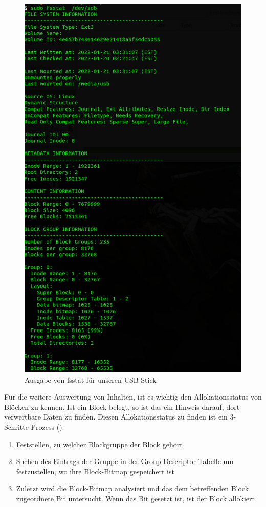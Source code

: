 \begin{figure}[H]
	\centering
	\includegraphics[width=12cm,keepaspectratio=true]{pictures/fsstat.png}
	\caption{
		Ausgabe von fsstat für unseren USB Stick
	}
	\label{fig:fsstat}
\end{figure}

Für die weitere Auswertung von Inhalten, ist es wichtig den Allokationsstatus von Blöcken zu kennen. Ist ein Block belegt, so ist das ein Hinweis darauf, dort verwertbare Daten zu finden. Diesen Allokationsstatus zu finden ist ein 3-Schritte-Prozess (\cite{Carrier.06.01.2022}):

\begin{enumerate}
	\item Feststellen, zu welcher Blockgruppe der Block gehört
	\item Suchen des Eintrags der Gruppe in der Group-Descriptor-Tabelle um festzustellen, wo ihre Block-Bitmap gespeichert ist
	\item Zuletzt wird die Block-Bitmap analysiert und das dem betreffenden Block zugeordnete Bit untersucht. Wenn das Bit gesetzt ist, ist der Block allokiert
\end{enumerate}

